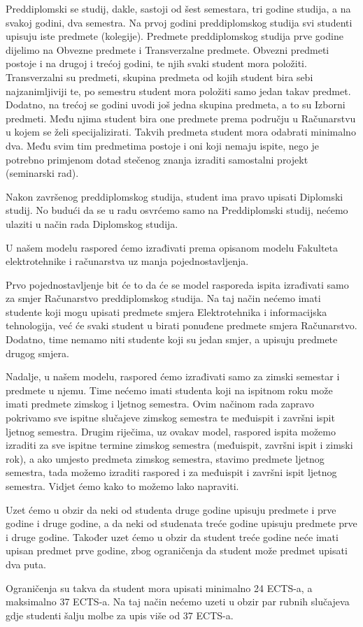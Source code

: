 \documentclass[times, utf8, zavrsni, numeric]{fer}
\begin{document}
Preddiplomski se studij, dakle, sastoji od šest semestara, tri godine studija, a na svakoj godini, dva semestra. Na prvoj godini preddiplomskog studija svi studenti upisuju iste predmete (kolegije). Predmete preddiplomskog studija prve godine dijelimo na Obvezne predmete i Transverzalne predmete. Obvezni predmeti postoje i na drugoj i trećoj godini, te njih svaki student mora položiti. Transverzalni su predmeti, skupina predmeta od kojih student bira sebi najzanimljiviji te, po semestru student mora položiti samo jedan takav predmet. Dodatno, na trećoj se godini uvodi još jedna skupina predmeta, a to su Izborni predmeti. Među njima student bira one predmete prema području u Računarstvu u kojem se želi specijalizirati. Takvih predmeta student mora odabrati minimalno dva. Među svim tim predmetima postoje i oni koji nemaju ispite, nego je potrebno primjenom dotad stečenog znanja izraditi samostalni projekt (seminarski rad).\par 
Nakon završenog preddiplomskog studija, student ima pravo upisati Diplomski studij. No budući da se u radu osvrćemo samo na Preddiplomski studij, nećemo ulaziti u način rada Diplomskog studija.\par
U našem modelu raspored ćemo izrađivati prema opisanom modelu Fakulteta elektrotehnike i računarstva uz manja pojednostavljenja.\par
Prvo pojednostavljenje bit će to da će se model rasporeda ispita izrađivati samo za smjer Računarstvo preddiplomskog studija. Na taj način nećemo imati studente koji mogu upisati predmete smjera Elektrotehnika i informacijska tehnologija, već će svaki student u birati ponuđene predmete smjera Računarstvo. Dodatno, time nemamo niti studente koji su jedan smjer, a upisuju predmete drugog smjera.\par
Nadalje, u našem modelu, raspored ćemo izrađivati samo za zimski semestar i predmete u njemu. Time nećemo imati studenta koji na ispitnom roku može imati predmete zimskog i ljetnog semestra. Ovim načinom rada zapravo pokrivamo sve ispitne slučajeve zimskog semestra te međuispit i završni ispit ljetnog semestra. Drugim riječima, uz ovakav model, raspored ispita možemo izraditi za sve ispitne termine zimskog semestra (međuispit, završni ispit i zimski rok), a ako umjesto predmeta zimskog semestra, stavimo predmete ljetnog semestra, tada možemo izraditi raspored i za međuispit i završni ispit ljetnog semestra. Vidjet ćemo kako to možemo lako napraviti.\par
Uzet ćemo u obzir da neki od studenta druge godine upisuju predmete i prve godine i druge godine, a da neki od studenata treće godine upisuju predmete prve i druge godine. Također uzet ćemo u obzir da student treće godine neće imati upisan predmet prve godine, zbog ograničenja da student može predmet upisati dva puta.\par
Ograničenja su takva da student mora upisati minimalno 24 ECTS-a, a maksimalno 37 ECTS-a. Na taj način nećemo uzeti u obzir par rubnih slučajeva gdje studenti šalju molbe za upis više od 37 ECTS-a. \par
\end{document}
